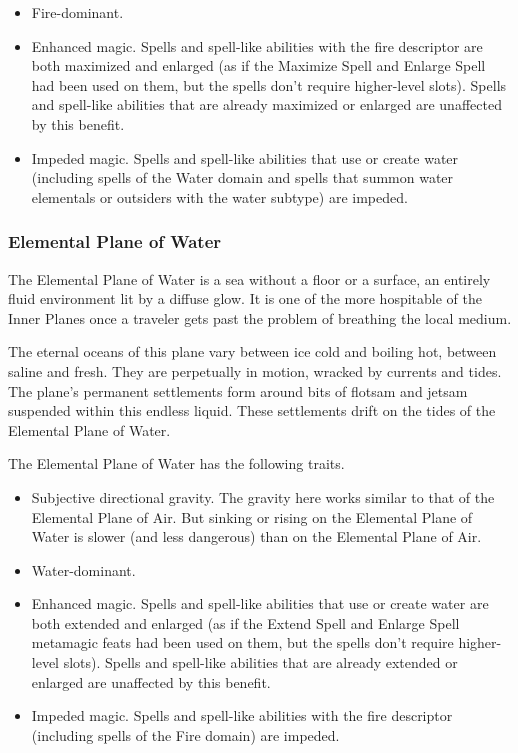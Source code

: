 \begin{itemize}
\item Fire-dominant.
\item Enhanced magic. Spells and spell-like abilities with the fire descriptor are both 
maximized and enlarged (as if the Maximize Spell and Enlarge Spell had been used 
on them, but the spells don't require higher-level slots). Spells and spell-like 
abilities that are already maximized or enlarged are unaffected by this benefit.
\item Impeded magic. Spells and spell-like abilities that use or create water (including 
spells of the Water domain and spells that summon water elementals or outsiders 
with the water subtype) are impeded. 
\end{itemize}

\subsubsection{Elemental Plane of Water}

The Elemental Plane of Water is a sea without a floor or a surface, an entirely 
fluid environment lit by a diffuse glow. It is one of the more hospitable of the 
Inner Planes once a traveler gets past the problem of breathing the local medium.

The eternal oceans of this plane vary between ice cold and boiling hot, between 
saline and fresh. They are perpetually in motion, wracked by currents and tides. 
The plane's permanent settlements form around bits of flotsam and jetsam suspended 
within this endless liquid. These settlements drift on the tides of the Elemental 
Plane of Water.

The Elemental Plane of Water has the following traits.

\begin{itemize}
\item Subjective directional gravity. The gravity here works similar to that of the Elemental 
Plane of Air. But sinking or rising on the Elemental Plane of Water is slower (and 
less dangerous) than on the Elemental Plane of Air.
\item Water-dominant.
\item Enhanced magic. Spells and spell-like abilities that use or create water are both 
extended and enlarged (as if the Extend Spell and Enlarge Spell metamagic feats 
had been used on them, but the spells don't require higher-level slots). Spells 
and spell-like abilities that are already extended or enlarged are unaffected by 
this benefit.
\item Impeded magic. Spells and spell-like abilities with the fire descriptor (including 
spells of the Fire domain) are impeded. 
\end{itemize}

